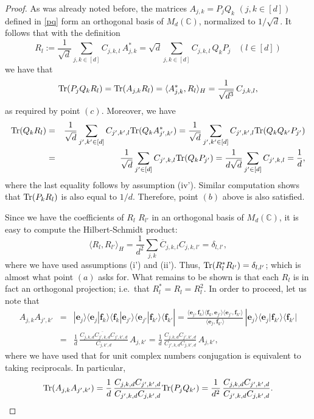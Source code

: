 \documentclass[12pt]{amsart}
\numberwithin{equation}{section}
\theoremstyle{definition}
\theoremstyle{remark}
\theoremstyle{remark}
\newcommand{\CC}{\ensuremath{\mathbb{C}}}
\newcommand{\eb}{\ensuremath{\mathbf{e}}}
\newcommand{\fb}{\ensuremath{\mathbf{f}}}
\begin{document}
\begin{proof}
As was already noted before, the matrices $A_{j,k}=P_jQ_k$ $(j,k\in [d])$ defined in \eqref{pq} form an orthogonal basis of $M_d(\CC)$, normalized to $1/\sqrt{d}$. It follows that with the definition
$$
R_l:=\frac{1}{\sqrt{d}}\sum_{j,k \in [d]}C_{j,k,l}\, A_{j,k}^* ={\sqrt{d}} \sum_{j,k\in [d]}C_{j,k,l}\, Q_kP_j\;\;\;
(l\in[d])
$$
we have that
$${\rm Tr}(P_j Q_kR_l)= 
{\rm Tr}(A_{j,k}R_l)=
\langle A_{j,k}^*,R_l\rangle_{H} = \frac{1}{\sqrt{d^3}} \, C_{j,k,l},$$
as required by point $(c)$. Moreover, we have 
\begin{eqnarray}
\nonumber
{\rm Tr}(Q_k R_l) &=& \frac{1}{\sqrt{d}}
\sum_{j',k'\in [d]}
 C_{j',k',l}
{\rm Tr}(Q_k A^*_{j',k'})=
\frac{1}{\sqrt{d}}
\sum_{j',k'\in [d]}
 C_{j',k',l}
{\rm Tr}(Q_k Q_{k'}P_{j'})
\\
\nonumber
&=&
\frac{1}{\sqrt{d}}
\sum_{j'\in [d]}
C_{j',k,l}
{\rm Tr}(Q_k P_{j'}) =
\frac{1}{d\sqrt{d}}
\sum_{j'\in [d]}
C_{j',k,l} =\frac{1}{d},
\end{eqnarray}
where the last equality follows by assumption (iv'). Similar computation shows that 
${\rm Tr}(P_k R_l)$ is also equal to $1/d$. Therefore,  point $(b)$ above is also satisfied.

\medskip

Since we have the coefficients of $R_l$ $R_{l'}$ in an orthogonal basis of $M_d(\CC)$, it is easy 
to compute the Hilbert-Schmidt product:
$$
\langle R_l,R_{l'}\rangle_{H}=
\frac{1}{d^2}\sum_{j,k} 
\overline{C}_{j,k,l} C_{j,k,l'} =
\delta_{l,l'},
$$
where we have used assumptions (i') and (ii'). Thus, ${\rm Tr}(R_l^*R_{l'})=\delta_{l,l'}$; which is almost what point $(a)$
asks for. What remains to be shown is that each $R_l$ is in fact an orthogonal projection; i.e.\ that
$R_l^* = R_l=R_l^2$. In order to proceed, let us note that
\begin{eqnarray}
\nonumber
A_{j,k}A_{j',k'} &=& 
|\eb_j\rangle\langle \eb_j|
\fb_k\rangle\langle \fb_k|
\eb_{j'}\rangle\langle \eb_{j'}|
\fb_{k'}\rangle\langle \fb_{k'}| 
=
\frac{\langle \eb_j,
\fb_k\rangle\langle \fb_k,
\eb_{j'}\rangle\langle \eb_{j'},
\fb_{k'}\rangle}{\langle \eb_j,\fb_{k'}\rangle}
\,
|\eb_j\rangle\langle \eb_{j}
|\fb_{k'}\rangle\langle \fb_{k'}|
\\
\nonumber
&=&
\frac{1}{d}\,
\frac{C_{j,k,d} \overline{C_{j',k,d}} C_{j',k',d}}{ C_{j,k',d}}
\,
A_{j,k'}
=
\frac{1}{d}\,
\frac{C_{j,k,d} C_{j',k',d}}{ 
C_{j',k,d}
C_{j,k',d}}
\,
A_{j,k'},
\end{eqnarray}
where we have used that for unit complex numbers conjugation is equivalent to taking reciprocals.
In particular, 
\begin{equation}
\label{eq:TrAA}
{\rm Tr}(A_{j,k}A_{j',k'})=
\frac{1}{d}\,
\frac{C_{j,k,d} C_{j',k',d}}{ 
C_{j',k,d}
C_{j,k',d}}
{\rm Tr}(P_jQ_{k'}) =
\frac{1}{d^2}\,\frac{C_{j,k,d} C_{j',k',d}}{ 
C_{j',k,d}
C_{j,k',d}}.
\end{equation}


\end{proof}
\end{document}
